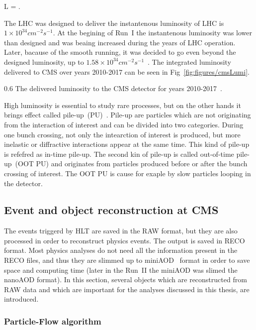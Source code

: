 {
 L = .
}

The LHC was designed to deliver the instantenous luminosity of LHC is $1 \times 10^{34} cm^{-2}s^{-1}$. At the begining of Run~I the instantenous luminosity was lower than designed and was beaing increased during the years of LHC operation. Later, bacause of the smooth running, it was decided to go even beyond the designed luminosity, up to $1.58 \times 10^{34} cm^{-2}s^{-1}$~\cite{Pralavorio:2272474}. The integrated luminosity delivered to CMS over years 2010-2017 can be seen in Fig~\ref{fig:figures/cmsLumi}.

                 {0.6}       %
                 { The delivered luminosity to the CMS detector for years 2010-2017~\cite{website:CMSlumi}. }


High luminosity is essential to study rare processes, but on the other hands it brings effect called pile-up~(PU)~\cite{Bayatian:2006nff}. Pile-up are particles which are not originating from the interaction of interest and can be divided into two categories. During one bunch crossing, not only the intearction of interest is produced, but more inelastic or diffractive interactions appear at the same time. This kind of pile-up is refefred as in-time pile-up. The second kin of pile-up is called out-of-time pile-up~(OOT PU) and originates from particles produced before or after the bunch crossing of interest. The OOT PU is cause for exaple by slow particles looping in the detector.

\newpage

\subsection{Event and object reconstruction at CMS}

The events triggerd by HLT are saved in the RAW format, but they are also processed in order to reconstruct physics events. The output is saved in RECO format. Most physics analyses do not need all the information present in the RECO files, and thus they are slimmed up to miniAOD~\cite{Petrucciani:2029414} format in order to save space and computing time (later in the Run~II the miniAOD was slimed the nanoAOD format). In this section, several objects which are reconstructed from RAW data and which are important for the analyses discussed in this thesis, are introduced.


\subsubsection{Particle-Flow algorithm}

